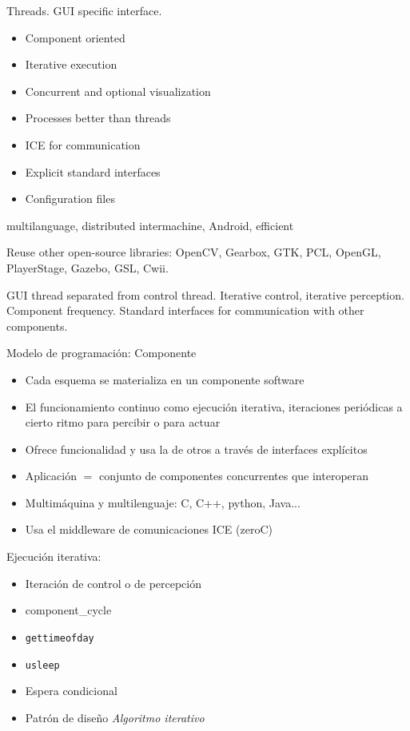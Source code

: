 \documentclass[twocolumn]{svjour3}          %
\begin{document}
Threads. GUI specific interface. 

\begin{itemize}
\item Component oriented 
\item Iterative execution
\item Concurrent and optional visualization
\item Processes better than threads
\item ICE for communication
\item Explicit standard interfaces
\item Configuration files 
\end{itemize}

multilanguage, distributed intermachine, Android, efficient

Reuse other open-source libraries: OpenCV, Gearbox, GTK, PCL, OpenGL, PlayerStage, Gazebo, GSL, Cwii.


GUI thread separated from control thread.
Iterative control, iterative perception. Component frequency.
Standard interfaces for communication with other components.

Modelo de programación: Componente
\begin{itemize}
\item Cada esquema se materializa en un {componente} software 
\item El funcionamiento continuo como {ejecución iterativa}, iteraciones periódicas a cierto ritmo para percibir o para actuar
\item Ofrece funcionalidad y usa la de otros a través de {interfaces} explícitos
\item Aplicación $=$ conjunto de componentes concurrentes que interoperan
\item {Multimáquina} y {multilenguaje}: C, C++, python, Java... 
\item Usa el middleware de comunicaciones ICE (zeroC)
\end{itemize}

Ejecución iterativa:
\begin{itemize}
\item Iteración de control o de percepción
\item component\_cycle 
\item \texttt{gettimeofday}
\item \texttt{usleep}
\item Espera condicional
\item Patrón de diseño \textit{Algoritmo iterativo}
\end{itemize}
\end{document}
